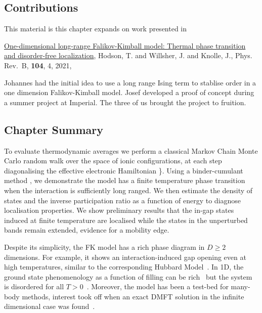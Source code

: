 \hypertarget{contributions}{%
\subsection{Contributions}\label{contributions}}

This material is this chapter expands on work presented in

\autocite{hodsonOnedimensionalLongRangeFalikovKimball2021} \href{https://link.aps.org/doi/10.1103/PhysRevB.104.045116}{One-dimensional long-range Falikov-Kimball model: Thermal phase transition and disorder-free localization}, Hodson, T. and Willsher, J. and Knolle, J., Phys. Rev.~B, \textbf{104}, 4, 2021,

Johannes had the initial idea to use a long range Ising term to stablise order in a one dimension Falikov-Kimball model. Josef developed a proof of concept during a summer project at Imperial. The three of us brought the project to fruition.

\hypertarget{chapter-summary}{%
\subsection{Chapter Summary}\label{chapter-summary}}

To evaluate thermodynamic averages we perform a classical Markov Chain Monte Carlo random walk over the space of ionic configurations, at each step diagonalising the effective electronic Hamiltonian \textcite{maskaThermodynamicsTwodimensionalFalicovKimball2006}\}. Using a binder-cumulant method \autocite{binderFiniteSizeScaling1981,musialMonteCarloSimulations2002}, we demonstrate the model has a finite temperature phase transition when the interaction is sufficiently long ranged. We then estimate the density of states and the inverse participation ratio as a function of energy to diagnose localisation properties. We show preliminary results that the in-gap states induced at finite temperature are localised while the states in the unperturbed bands remain extended, evidence for a mobility edge.

Despite its simplicity, the FK model has a rich phase diagram in \(D \geq 2\) dimensions. For example, it shows an interaction-induced gap opening even at high temperatures, similar to the corresponding Hubbard Model~\autocite{brandtThermodynamicsCorrelationFunctions1989}. In 1D, the ground state phenomenology as a function of filling can be rich~\autocite{gruberGroundStatesSpinless1990} but the system is disordered for all \(T > 0\)~\autocite{kennedyItinerantElectronModel1986}. Moreover, the model has been a test-bed for many-body methods, interest took off when an exact DMFT solution in the infinite dimensional case was found~\autocite{antipovCriticalExponentsStrongly2014,ribicNonlocalCorrelationsSpectral2016,freericksExactDynamicalMeanfield2003,herrmannNonequilibriumDynamicalCluster2016}.

